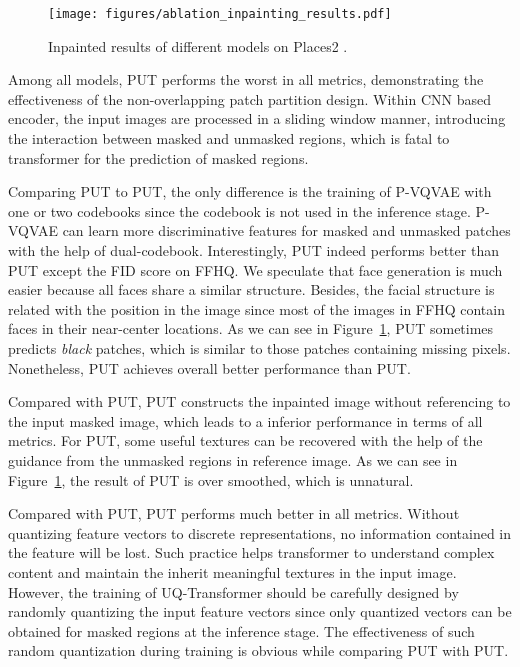 \documentclass[10pt,twocolumn,letterpaper]{article}
\newcommand{\Fref}[1]{Figure~\ref{#1}}
\begin{document}
\begin{figure}[t]
	\centering
	\texttt{[image: figures/ablation\_inpainting\_results.pdf]} 
	\vspace{-15pt}
	\caption{Inpainted results of different models on Places2 \cite{zhou2017places}.}
	\vspace{-10pt}
	\label{figure: ablation_inpainting_results}
\end{figure}



Among all models, PUT performs the worst in all metrics, demonstrating the effectiveness of the non-overlapping patch partition design. Within CNN based encoder, the input images are processed in a sliding window manner, introducing the interaction between masked and unmasked regions, which is fatal to transformer for the prediction of masked regions. 

Comparing PUT to PUT, the only difference is the training of P-VQVAE with one or two codebooks since the codebook  is not used in the inference stage. P-VQVAE can learn more discriminative features for masked and unmasked patches with the help of dual-codebook. Interestingly, PUT indeed performs better than PUT except the FID score on FFHQ. We speculate that face generation is much easier because all faces share a similar structure. Besides, the facial structure is related with the position in the image since most of the images in FFHQ contain faces in their near-center locations. As we can see in \Fref{figure: ablation_inpainting_results}, PUT sometimes predicts \emph{black} patches, which is similar to those patches containing missing pixels. Nonetheless, PUT achieves overall better performance than PUT.

Compared with PUT, PUT constructs the inpainted image without referencing to the input masked image, which leads to a inferior performance in terms of all metrics. For PUT, some useful textures can be recovered with the help of the guidance from the unmasked regions in reference image. As we can see in \Fref{figure: ablation_inpainting_results}, the result of PUT is over smoothed, which is unnatural.

Compared with PUT, PUT performs much better in all metrics. Without quantizing feature vectors to discrete representations, no information contained in the feature will be lost. Such practice helps transformer to understand complex content and maintain the inherit meaningful textures in the input image. However, the training of UQ-Transformer should be carefully designed by randomly quantizing the input feature vectors since only quantized vectors can be obtained for masked regions at the inference stage. The effectiveness of such random quantization during training is obvious while comparing PUT with PUT.
\end{document}
